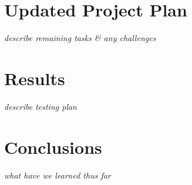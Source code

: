 \documentclass[sigchi, 12pt, nonacm=true, timestamp=true, screen=true]{acmart}
\begin{document}
\section{Updated Project Plan}

\textit{describe remaining tasks \& any challenges}

\section{Results}

\textit{describe testing plan}

\section{Conclusions}

\textit{what have we learned thus far}

%
%
%
%
%
%
%	
%
%



%



%

\end{document}

